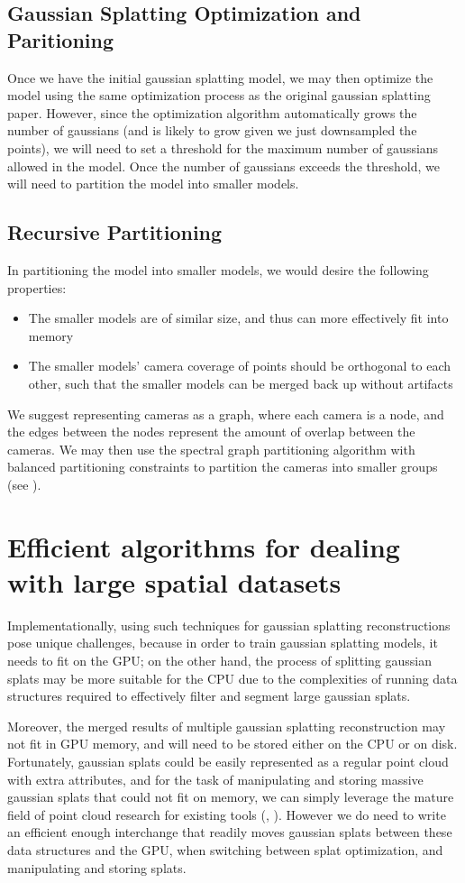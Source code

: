 \documentclass[logo,bsc,singlespacing,parskip]{infthesis}
\begin{document}
\subsection{Gaussian Splatting Optimization and Paritioning}
Once we have the initial gaussian splatting model, we may then optimize the model using the same optimization process as the original gaussian splatting paper. However, since the optimization algorithm automatically grows the number of gaussians (and is likely to grow given we just downsampled the points), we will need to set a threshold for the maximum number of gaussians allowed in the model. Once the number of gaussians exceeds the threshold, we will need to partition the model into smaller models.
\subsection{Recursive Partitioning}
In partitioning the model into smaller models, we would desire the following properties:
\begin{itemize}
    \item The smaller models are of similar size, and thus can more effectively fit into memory
    \item The smaller models' camera coverage of points should be orthogonal to each other, such that the smaller models can be merged back up without artifacts
\end{itemize}
We suggest representing cameras as a graph, where each camera is a node, and the edges between the nodes represent the amount of overlap between the cameras. We may then use the spectral graph partitioning algorithm with balanced partitioning constraints to partition the cameras into smaller groups (see \cite{bgraph}). 

\section{Efficient algorithms for dealing with large spatial datasets}

Implementationally, using such techniques for gaussian splatting reconstructions pose unique challenges, because in order to train gaussian splatting models, it needs to fit on the GPU; on the other hand, the process of splitting gaussian splats may be more suitable for the CPU due to the complexities of running data structures required to effectively filter and segment large gaussian splats.

Moreover, the merged results of multiple gaussian splatting reconstruction may not fit in GPU memory, and will need to be stored either on the CPU or on disk. Fortunately, gaussian splats could be easily represented as a regular point cloud with extra attributes, and for the task of manipulating and storing massive gaussian splats that could not fit on memory, we can simply leverage the mature field of point cloud research for existing tools (\cite{pcl}, \cite{cilantro}). However we do need to write an efficient enough interchange that readily moves gaussian splats between these data structures and the GPU, when switching between splat optimization, and manipulating and storing splats.
\end{document}

